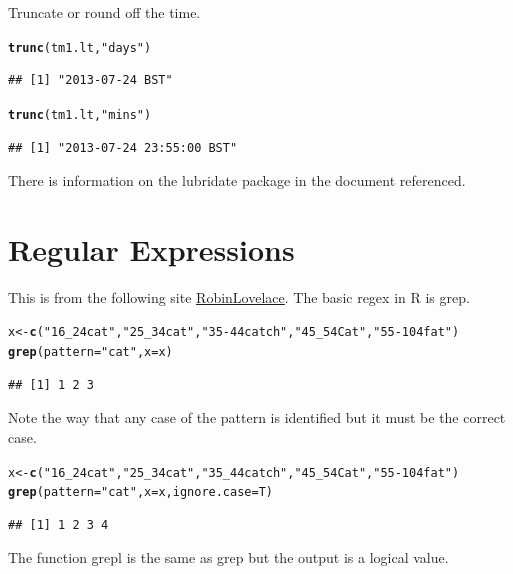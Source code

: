 \documentclass[12pt, a4paper, oneside]{article}\usepackage[]{graphicx}\usepackage[]{color}
\makeatletter
\newcommand{\hlstr}[1]{\textcolor[rgb]{0.192,0.494,0.8}{#1}}%
\newcommand{\hlstd}[1]{\textcolor[rgb]{0.345,0.345,0.345}{#1}}%
\newcommand{\hlkwb}[1]{\textcolor[rgb]{0.69,0.353,0.396}{#1}}%
\newcommand{\hlkwc}[1]{\textcolor[rgb]{0.333,0.667,0.333}{#1}}%
\newcommand{\hlkwd}[1]{\textcolor[rgb]{0.737,0.353,0.396}{\textbf{#1}}}%
\newenvironment{kframe}{%
 \def\at@end@of@kframe{}%
 \ifinner\ifhmode%
  \def\at@end@of@kframe{\end{minipage}}%
  \begin{minipage}{\columnwidth}%
 \fi\fi%
 \def\FrameCommand##1{\hskip\@totalleftmargin \hskip-\fboxsep
 \colorbox{shadecolor}{##1}\hskip-\fboxsep
     \hskip-\linewidth \hskip-\@totalleftmargin \hskip\columnwidth}%
 \MakeFramed {\advance\hsize-\width
   \@totalleftmargin\z@ \linewidth\hsize
   \@setminipage}}%
 {\par\unskip\endMakeFramed%
 \at@end@of@kframe}
\newenvironment{knitrout}{}{} %
\makeatother
\begin{document}
Truncate or round off the time. 
\begin{knitrout}
\color{fgcolor}\begin{kframe}
\begin{alltt}
\hlkwd{trunc}\hlstd{(tm1.lt,} \hlstr{"days"}\hlstd{)}
\end{alltt}
\begin{verbatim}
## [1] "2013-07-24 BST"
\end{verbatim}
\begin{alltt}
\hlkwd{trunc}\hlstd{(tm1.lt,} \hlstr{"mins"}\hlstd{)}
\end{alltt}
\begin{verbatim}
## [1] "2013-07-24 23:55:00 BST"
\end{verbatim}
\end{kframe}
\end{knitrout}
There is information on the lubridate package in the document referenced. 

\section{Regular Expressions}
This is from the following site \href{http://robinlovelace.net//r/2014/04/14/regex-in-R-RStudio.html}{RobinLovelace}.  The basic regex in R is grep. 

\begin{knitrout}
\color{fgcolor}\begin{kframe}
\begin{alltt}
\hlstd{x} \hlkwb{<-} \hlkwd{c}\hlstd{(}\hlstr{"16_24cat"}\hlstd{,} \hlstr{"25_34cat"}\hlstd{,} \hlstr{"35-44catch"}\hlstd{,} \hlstr{"45_54Cat"}\hlstd{,} \hlstr{"55-104fat"}\hlstd{)}
\hlkwd{grep}\hlstd{(}\hlkwc{pattern} \hlstd{=} \hlstr{"cat"}\hlstd{,} \hlkwc{x} \hlstd{= x)}
\end{alltt}
\begin{verbatim}
## [1] 1 2 3
\end{verbatim}
\end{kframe}
\end{knitrout}
Note the way that any case of the pattern is identified but it must be the correct case. 
\begin{knitrout}
\color{fgcolor}\begin{kframe}
\begin{alltt}
\hlstd{x} \hlkwb{<-} \hlkwd{c}\hlstd{(}\hlstr{"16_24cat"}\hlstd{,} \hlstr{"25_34cat"}\hlstd{,} \hlstr{"35_44catch"}\hlstd{,} \hlstr{"45_54Cat"}\hlstd{,} \hlstr{"55-104fat"}\hlstd{)}
\hlkwd{grep}\hlstd{(}\hlkwc{pattern} \hlstd{=} \hlstr{"cat"}\hlstd{,} \hlkwc{x} \hlstd{= x,}\hlkwc{ignore.case} \hlstd{= T)}
\end{alltt}
\begin{verbatim}
## [1] 1 2 3 4
\end{verbatim}
\end{kframe}
\end{knitrout}
The function grepl is the same as grep but the output is a logical value.
\end{document}
